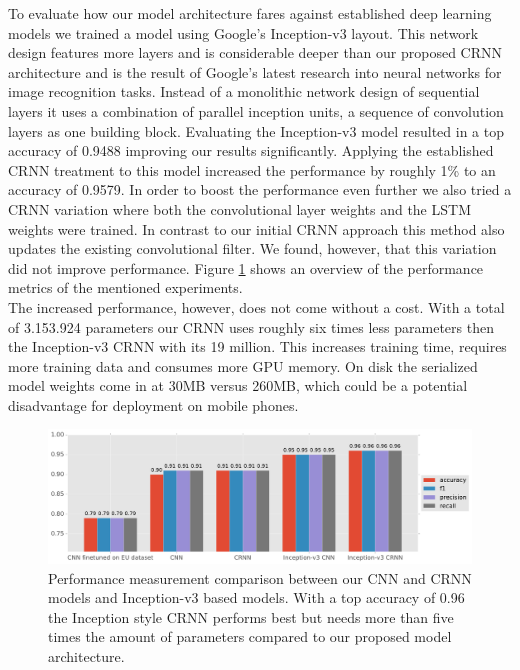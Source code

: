 To evaluate how our model architecture fares against established deep learning models we trained a model using Google's Inception-v3\cite{szegedy2016rethinking} layout. This network design features more layers and is considerable deeper than our proposed CRNN architecture and is the result of Google's latest research into neural networks for image recognition tasks. Instead of a monolithic network design of sequential layers it uses a combination of parallel inception units, a sequence of convolution layers as one building block. Evaluating the Inception-v3 model resulted in a top accuracy of 0.9488 improving our results significantly. Applying the established CRNN treatment to this model increased the performance by roughly 1\% to an accuracy of 0.9579. In order to boost the performance even further we also tried a CRNN variation where both the convolutional layer weights and the LSTM weights were trained. In contrast to our initial CRNN approach this method also updates the existing convolutional filter. We found, however, that this variation did not improve performance. Figure \ref{fig:news_results} shows an overview of the performance metrics of the mentioned experiments.\\
The increased performance, however, does not come without a cost. With a total of 3.153.924 parameters our CRNN uses roughly six times less parameters then the Inception-v3 CRNN with its 19 million. This increases training time, requires more training data and consumes more GPU memory. On disk the serialized model weights come in at 30MB versus 260MB, which could be a potential disadvantage for deployment on mobile phones.

	\begin{figure}[]
  		\centering
    	\includegraphics[width=\textwidth, keepaspectratio]{plots/results_news_plot.pdf}
    	\caption{Performance measurement comparison between our CNN and CRNN models and Inception-v3 based models. With a top accuracy of 0.96 the Inception style CRNN performs best but needs more than five times the amount of parameters compared to our proposed model architecture.}
    	\label{fig:news_results}
	\end{figure}


